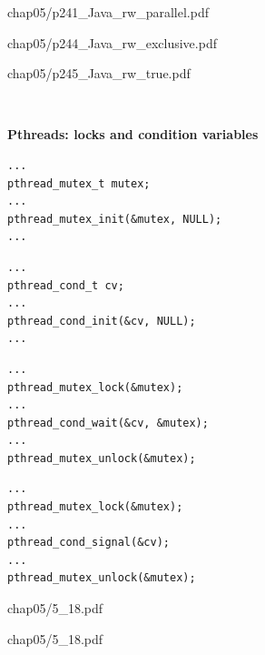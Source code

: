 \documentclass{article}
\newcommand{\myfig}[1]{\newpage\begin{overpic}[scale=1.5]{#1}}
\newcommand{\myfigs}[2]{\newpage\begin{overpic}[scale=#1]{#2}}
\newcommand{\myfigsp}[3]{\newpage\begin{overpic}[scale=#1,page=#2]{#3}}
\newcommand{\myfigend}{\end{overpic}}
\newcommand{\ti}[1]{
\newpage
\mbox{~}

\vspace{1.25in}
\centerline{\bf #1}
}
\begin{document}
\myfigs{1}{chap05/p241_Java_rw_parallel.pdf}
\myfigend
\myfig{chap05/p244_Java_rw_exclusive.pdf}
\myfigend
\myfig{chap05/p245_Java_rw_true.pdf}
\myfigend

\ti{Pthreads: locks and condition variables}

\begin{multicols}{2}
\begin{Verbatim}[label=Lock]
...
pthread_mutex_t mutex;
...
pthread_mutex_init(&mutex, NULL);
...
\end{Verbatim}

\begin{Verbatim}[label=Condition variable]
...
pthread_cond_t cv;
...
pthread_cond_init(&cv, NULL);
...
\end{Verbatim}
\end{multicols}

\begin{multicols}{2}
\begin{Verbatim}[label=Thread 0]
...
pthread_mutex_lock(&mutex);
...
pthread_cond_wait(&cv, &mutex);
...
pthread_mutex_unlock(&mutex);
\end{Verbatim}
\begin{Verbatim}[label=Thread 1]
...
pthread_mutex_lock(&mutex);
...
pthread_cond_signal(&cv);
...
pthread_mutex_unlock(&mutex);
\end{Verbatim}
\end{multicols}


\newpage
\myfigsp{.9}{1}{chap05/5_18.pdf}
\myfigend
\myfigsp{.9}{2}{chap05/5_18.pdf}
\myfigend
\end{document}
